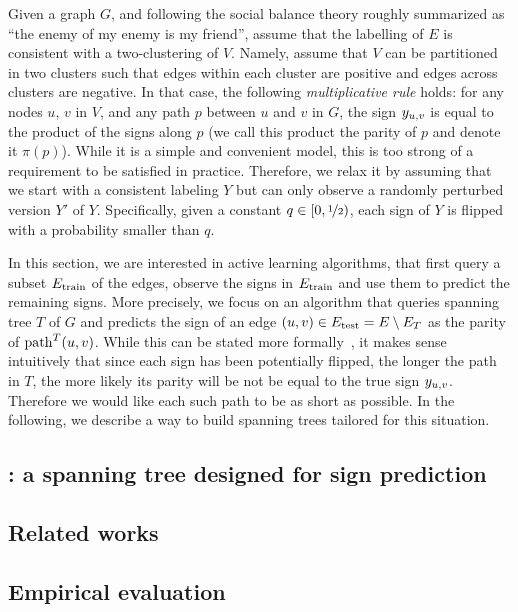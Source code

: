 Given a graph $G$, and following the social balance theory roughly summarized as \enquote{the enemy
of my enemy is my friend}, assume that the labelling of $E$ is consistent with a two-clustering of
$V$. Namely, assume that $V$ can be partitioned in two clusters such that edges within each cluster
are positive and edges across clusters are negative. In that case, the following
\emph{multiplicative rule} holds: for any nodes $u$, $v$ in $V$, and any path $p$ between $u$ and
$v$ in $G$, the sign $y_{u, v}$ is equal to the product of the signs along $p$ (we call this product the
parity of $p$ and denote it $\pi(p)$). While it is a simple and convenient model, this is too strong
of a requirement to be satisfied in practice. Therefore, we relax it by assuming that we start with
a consistent labeling $Y$ but can only observe a randomly perturbed version $Y'$ of $Y$.
Specifically, given a constant $q\in [0, \nicefrac{1}{2})$, each sign of $Y$ is flipped with a
probability smaller than $q$.

In this section, we are interested in active learning algorithms, that first query a subset
$E_{\mathrm{train}}$ of the edges, observe the signs in $E_{\mathrm{train}}$ and use them to predict the remaining signs.
More precisely, we focus on an algorithm that queries spanning tree $T$ of $G$ and predicts the sign
of an edge $(u,v) \in E_{\mathrm{test}} = E \setminus E_T$ as the parity of $\operatorname{path}^T(u, v)$. While this
can be stated more formally~\autocite[Section
4.1]{Cesa-Bianchi2012b}, it makes sense intuitively that since each sign has been potentially
flipped, the longer the path in $T$, the more likely its parity will be not be equal to the true
sign $y_{u, v}{}$. Therefore we would like each such path to be as short as possible. In the following,
we describe a way to build spanning trees tailored for this situation.

\subsection{\gtx{}: a spanning tree designed for sign prediction}
\label{sub:gtx_a_simple_low_stretch_tree_construction}



\subsection{Related works}
\label{sub:gtx_related_works}



\subsection{Empirical evaluation}
\label{sub:gtx_empirical_evaluation}



